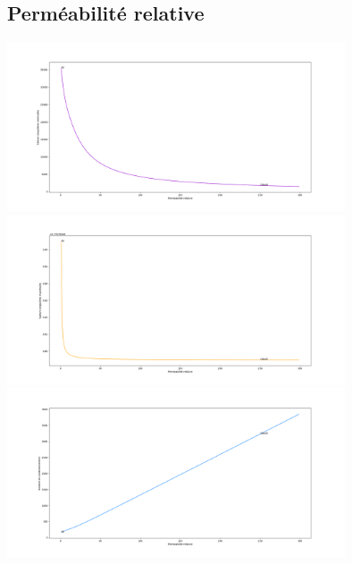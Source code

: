 \documentclass{article}
\begin{document}
\subsection{Perméabilité relative}
\begin{center}
    \includegraphics[width = 10cm]{influences/plots/perm_min.png}
    \includegraphics[width = 10cm]{influences/plots/perm_max.png}
    \includegraphics[width = 10cm]{influences/plots/perm_k.png}
\end{center}
\end{document}

